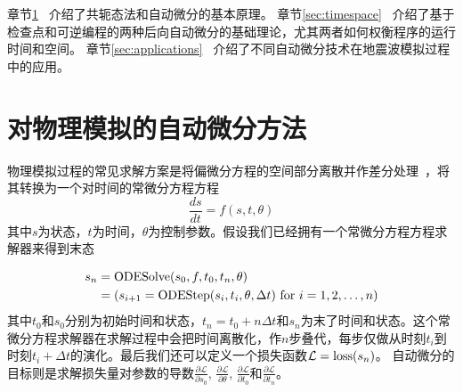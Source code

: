 \documentclass[A4,twoside,fontset=ubuntu,UTF8]{ctexart}
\begin{document}

章节\ref{sec:forwardbackward}~ 介绍了共轭态法和自动微分的基本原理。
章节\ref{sec:timespace}~ 介绍了基于检查点和可逆编程的两种后向自动微分的基础理论，尤其两者如何权衡程序的运行时间和空间。
章节\ref{sec:applications}~ 介绍了不同自动微分技术在地震波模拟过程中的应用。

\section{对物理模拟的自动微分方法}\label{sec:forwardbackward}

    物理模拟过程的常见求解方案是将偏微分方程的空间部分离散并作差分处理~\cite{Grote2010}，将其转换为一个对时间的常微分方程方程
    $$\frac{d s}{d t} = f(s, t, \theta)$$
其中$s$为状态，$t$为时间，$\theta$为控制参数。假设我们已经拥有一个常微分方程方程求解器来得到末态

\begin{align}
    \begin{split}
    s_n &= \text{ODESolve}(s_0, f, t_0, t_n, \theta)\\
        &= (s_{i+1} = {\rm ODEStep}(s_{i}, t_i, \theta, \Delta t) ~\text{for $i=1,2, \ldots, n$})
    \end{split}
\end{align}
其中$t_0$和$s_0$分别为初始时间和状态，$t_n=t_0+n\Delta t$和$s_n$为末了时间和状态。这个常微分方程求解器在求解过程中会把时间离散化，作$n$步叠代，每步仅做从时刻$t_i$到时刻$t_{i}+\Delta t$的演化。最后我们还可以定义一个损失函数$\mathcal{L} = {\rm loss}(s_n)$。
    自动微分的目标则是求解损失量对参数的导数$\frac{\partial \mathcal{L}}{\partial s_0}$, $\frac{\partial \mathcal{L}}{\partial \theta}$, $\frac{\partial \mathcal{L}}{\partial t_0}$和$\frac{\partial \mathcal{L}}{\partial t_n}$。
\end{document}
